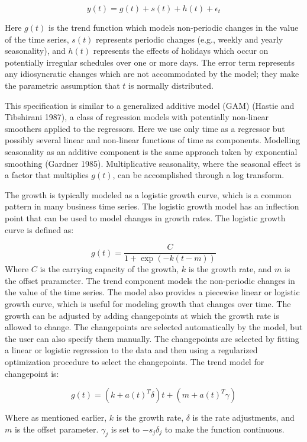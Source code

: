 \documentclass[mstat,12pt]{unswthesis}
\begin{document}
\[
y(t) = g(t) + s(t) + h(t) + \epsilon_t
\]

Here \(g(t)\) is the trend function which models non-periodic changes in
the value of the time series, \(s(t)\) represents periodic changes
(e.g., weekly and yearly seasonality), and \(h(t)\) represents the
effects of holidays which occur on potentially irregular schedules over
one or more days. The error term represents any idiosyncratic changes
which are not accommodated by the model; they make the parametric
assumption that \(t\) is normally distributed.

This specification is similar to a generalized additive model (GAM)
(Hastie and Tibshirani 1987), a class of regression models with
potentially non-linear smoothers applied to the regressors. Here we use
only time as a regressor but possibly several linear and non-linear
functions of time as components. Modelling seasonality as an additive
component is the same approach taken by exponential smoothing (Gardner
1985). Multiplicative seasonality, where the seasonal effect is a factor
that multiplies \(g(t)\), can be accomplished through a log transform.

The growth is typically modeled as a logistic growth curve, which is a
common pattern in many business time series. The logistic growth model
has an inflection point that can be used to model changes in growth
rates. The logistic growth curve is defined as:

\[
g(t) = \frac{C}{1 + \exp(-k(t - m))}
\] Where \(C\) is the carrying capacity of the growth, \(k\) is the
growth rate, and \(m\) is the offset prarameter. The trend component
models the non-periodic changes in the value of the time series. The
model also provides a piecewise linear or logistic growth curve, which
is useful for modeling growth that changes over time. The growth can be
adjusted by adding changepoints at which the growth rate is allowed to
change. The changepoints are selected automatically by the model, but
the user can also specify them manually. The changepoints are selected
by fitting a linear or logistic regression to the data and then using a
regularized optimization procedure to select the changepoints. The trend
model for changepoint is:

\[
g(t) = (k+a(t)^T\delta) t + (m+a(t)^T\gamma)
\]

Where as mentioned earlier, \(k\) is the growth rate, \(\delta\) is the
rate adjustments, and \(m\) is the offset parameter. \(\gamma_j\) is set
to \(-s_j\delta_j\) to make the function continuous.
\end{document}
